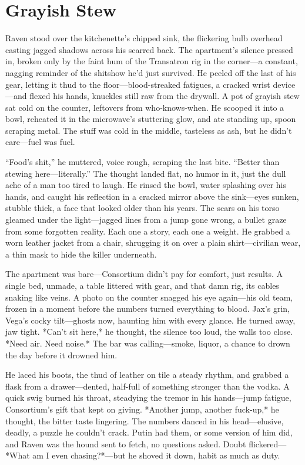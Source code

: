 \documentclass[12pt]{book}
\begin{document}
\section{Grayish Stew}

Raven stood over the kitchenette’s chipped sink, the flickering bulb overhead casting jagged shadows across his scarred back. The apartment’s silence pressed in, broken only by the faint hum of the Transatron rig in the corner—a constant, nagging reminder of the shitshow he’d just survived. He peeled off the last of his gear, letting it thud to the floor—blood-streaked fatigues, a cracked wrist device—and flexed his hands, knuckles still raw from the drywall. A pot of grayish stew sat cold on the counter, leftovers from who-knows-when. He scooped it into a bowl, reheated it in the microwave’s stuttering glow, and ate standing up, spoon scraping metal. The stuff was cold in the middle, tasteless as ash, but he didn’t care—fuel was fuel.

“Food’s shit,” he muttered, voice rough, scraping the last bite. “Better than stewing here—literally.” The thought landed flat, no humor in it, just the dull ache of a man too tired to laugh. He rinsed the bowl, water splashing over his hands, and caught his reflection in a cracked mirror above the sink—eyes sunken, stubble thick, a face that looked older than his years. The scars on his torso gleamed under the light—jagged lines from a jump gone wrong, a bullet graze from some forgotten reality. Each one a story, each one a weight. He grabbed a worn leather jacket from a chair, shrugging it on over a plain shirt—civilian wear, a thin mask to hide the killer underneath.

The apartment was bare—Consortium didn’t pay for comfort, just results. A single bed, unmade, a table littered with gear, and that damn rig, its cables snaking like veins. A photo on the counter snagged his eye again—his old team, frozen in a moment before the numbers turned everything to blood. Jax’s grin, Vega’s cocky tilt—ghosts now, haunting him with every glance. He turned away, jaw tight. *Can’t sit here,* he thought, the silence too loud, the walls too close. *Need air. Need noise.* The bar was calling—smoke, liquor, a chance to drown the day before it drowned him.

He laced his boots, the thud of leather on tile a steady rhythm, and grabbed a flask from a drawer—dented, half-full of something stronger than the vodka. A quick swig burned his throat, steadying the tremor in his hands—jump fatigue, Consortium’s gift that kept on giving. *Another jump, another fuck-up,* he thought, the bitter taste lingering. The numbers danced in his head—elusive, deadly, a puzzle he couldn’t crack. Putin had them, or some version of him did, and Raven was the hound sent to fetch, no questions asked. Doubt flickered—*What am I even chasing?*—but he shoved it down, habit as much as duty.
\end{document}
